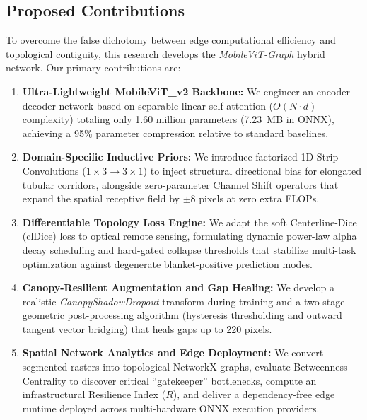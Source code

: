 \documentclass[conference]{IEEEtran}
\begin{document}
\subsection{Proposed Contributions}
To overcome the false dichotomy between edge computational efficiency and topological contiguity, this research develops the \textit{MobileViT-Graph} hybrid network. Our primary contributions are:
\begin{enumerate}
    \item \textbf{Ultra-Lightweight MobileViT\_v2 Backbone:} We engineer an encoder-decoder network based on separable linear self-attention ($O(N \cdot d)$ complexity) totaling only 1.60 million parameters (7.23~MB in ONNX), achieving a 95\% parameter compression relative to standard baselines.
    \item \textbf{Domain-Specific Inductive Priors:} We introduce factorized 1D Strip Convolutions ($1\times3 \to 3\times1$) to inject structural directional bias for elongated tubular corridors, alongside zero-parameter Channel Shift operators that expand the spatial receptive field by $\pm8$ pixels at zero extra FLOPs.
    \item \textbf{Differentiable Topology Loss Engine:} We adapt the soft Centerline-Dice (clDice) loss to optical remote sensing, formulating dynamic power-law alpha decay scheduling and hard-gated collapse thresholds that stabilize multi-task optimization against degenerate blanket-positive prediction modes.
    \item \textbf{Canopy-Resilient Augmentation and Gap Healing:} We develop a realistic \textit{CanopyShadowDropout} transform during training and a two-stage geometric post-processing algorithm (hysteresis thresholding and outward tangent vector bridging) that heals gaps up to 220 pixels.
    \item \textbf{Spatial Network Analytics and Edge Deployment:} We convert segmented rasters into topological NetworkX graphs, evaluate Betweenness Centrality to discover critical ``gatekeeper'' bottlenecks, compute an infrastructural Resilience Index ($R$), and deliver a dependency-free edge runtime deployed across multi-hardware ONNX execution providers.
\end{enumerate}
\end{document}
